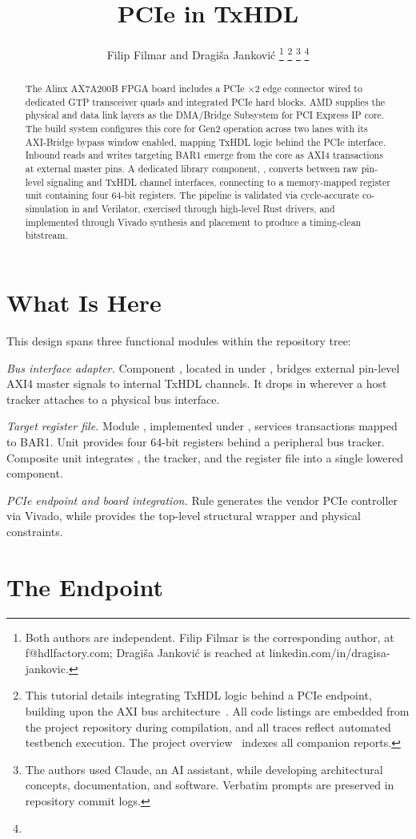 \documentclass[journal,9pt]{IEEEtran}
\title{PCIe in TxHDL}
\author{Filip Filmar and Dragiša Janković%
\thanks{Both authors are independent. Filip Filmar is the
corresponding author, at f@hdlfactory.com; Dragiša Janković is
reached at linkedin.com/in/dragisa-jankovic.}%
\thanks{This tutorial details integrating TxHDL logic behind a PCIe endpoint,
building upon the AXI bus architecture~\cite{axi}. All code listings are
embedded from the project repository \code{HDL/txhdl} during compilation, and
all traces reflect automated testbench execution. The project overview~\cite{cover}
indexes all companion reports.}%
\thanks{The authors used Claude, an AI assistant, while developing
architectural concepts, documentation, and software. Verbatim prompts are
preserved in repository commit logs.}%
\thanks{\buildstamp}}
\begin{document}
\maketitle

\begin{abstract}
The Alinx AX7A200B FPGA board includes a PCIe $\times$2 edge connector wired to
dedicated GTP transceiver quads and integrated PCIe hard blocks. AMD supplies
the physical and data link layers as the DMA/Bridge Subsystem for PCI Express IP
core. The build system configures this core for Gen2 operation across two lanes
with its AXI-Bridge bypass window enabled, mapping TxHDL logic behind the PCIe
interface. Inbound reads and writes targeting BAR1 emerge from the core as AXI4
transactions at external master pins. A dedicated library component,
, converts between raw pin-level signaling and TxHDL channel
interfaces, connecting to a memory-mapped register unit containing four 64-bit
registers. The pipeline is validated via cycle-accurate co-simulation in
 and Verilator, exercised through high-level Rust drivers, and
implemented through Vivado synthesis and placement to produce a timing-clean
bitstream.
\end{abstract}

\section{What Is Here}
\label{sec:p-what}

This design spans three functional modules within the repository tree:

\emph{Bus interface adapter.} Component , located in
 under , bridges external pin-level AXI4
master signals to internal TxHDL channels. It drops in wherever a host tracker
attaches to a physical bus interface.

\emph{Target register file.} Module , implemented under
, services transactions mapped to BAR1. Unit  provides
four 64-bit registers behind a peripheral bus tracker. Composite unit
 integrates , the tracker, and the register file
into a single lowered component.

\emph{PCIe endpoint and board integration.} Rule 
generates the vendor PCIe controller via Vivado, while 
provides the top-level structural wrapper and physical constraints.

\section{The Endpoint}
\label{sec:p-endpoint}
\end{document}
